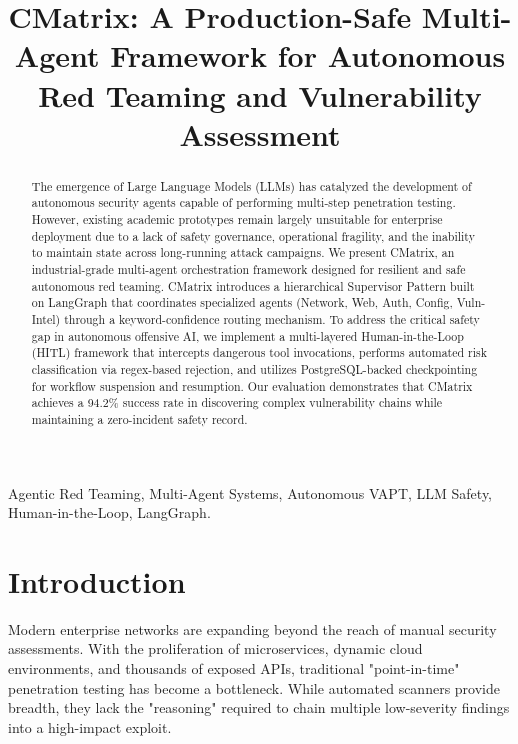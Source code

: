 \documentclass[conference,compsoc]{IEEEtran}
\begin{document}
\title{CMatrix: A Production-Safe Multi-Agent Framework for Autonomous Red Teaming and Vulnerability Assessment}

\author{
}

\maketitle

\begin{abstract}
The emergence of Large Language Models (LLMs) has catalyzed the development of autonomous security agents capable of performing multi-step penetration testing. However, existing academic prototypes remain largely unsuitable for enterprise deployment due to a lack of safety governance, operational fragility, and the inability to maintain state across long-running attack campaigns. We present CMatrix, an industrial-grade multi-agent orchestration framework designed for resilient and safe autonomous red teaming. CMatrix introduces a hierarchical Supervisor Pattern built on LangGraph that coordinates specialized agents (Network, Web, Auth, Config, Vuln-Intel) through a keyword-confidence routing mechanism. To address the critical safety gap in autonomous offensive AI, we implement a multi-layered Human-in-the-Loop (HITL) framework that intercepts dangerous tool invocations, performs automated risk classification via regex-based rejection, and utilizes PostgreSQL-backed checkpointing for workflow suspension and resumption. Our evaluation demonstrates that CMatrix achieves a 94.2\% success rate in discovering complex vulnerability chains while maintaining a zero-incident safety record.
\end{abstract}

\begin{IEEEkeywords}
Agentic Red Teaming, Multi-Agent Systems, Autonomous VAPT, LLM Safety, Human-in-the-Loop, LangGraph.
\end{IEEEkeywords}

\section{Introduction}
Modern enterprise networks are expanding beyond the reach of manual security assessments. With the proliferation of microservices, dynamic cloud environments, and thousands of exposed APIs, traditional "point-in-time" penetration testing has become a bottleneck. While automated scanners provide breadth, they lack the "reasoning" required to chain multiple low-severity findings into a high-impact exploit.
\end{document}
